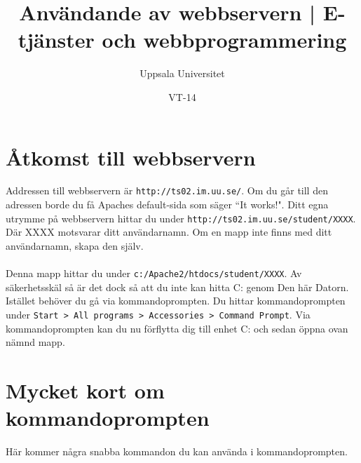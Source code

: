 \documentclass{article}
\begin{document}
  \title{ Användande av webbservern | E-tjänster och webbprogrammering }
  \author{ Uppsala Universitet }
  \date{ VT-14 }
  \maketitle

  \lstset{language=PHP}

  \section{Åtkomst till webbservern}
    Addressen till webbservern är \texttt{http://ts02.im.uu.se/}. Om du går till den adressen borde du få Apaches default-sida som säger ``It works!". Ditt egna utrymme på webbservern hittar du under \texttt{http://ts02.im.uu.se/student/XXXX}. Där XXXX motsvarar ditt användarnamn. Om en mapp inte finns med ditt användarnamn, skapa den själv.

  \paragraph{}
    Denna mapp hittar du under \texttt{c:/Apache2/htdocs/student/XXXX}. Av säkerhetsskäl så är det dock så att du inte kan hitta C: genom Den här Datorn. Istället behöver du gå via kommandoprompten. Du hittar kommandoprompten under \texttt{Start > All programs > Accessories > Command Prompt}. Via kommandoprompten kan du nu förflytta dig till enhet C: och sedan öppna ovan nämnd mapp.

  \section{Mycket kort om kommandoprompten}
    Här kommer några snabba kommandon du kan använda i kommandoprompten.
\end{document}

